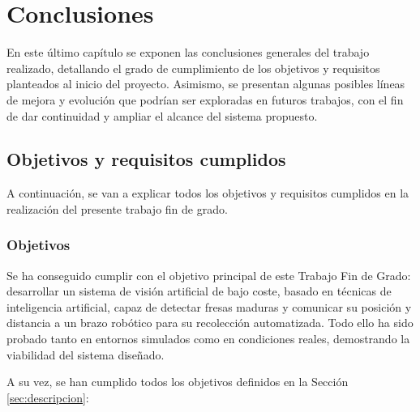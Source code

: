 \chapter{Conclusiones}
\label{cap:capitulo6}

En este último capítulo se exponen las conclusiones generales del trabajo realizado, detallando el grado de cumplimiento de los objetivos y requisitos planteados al inicio del proyecto. Asimismo, %
se presentan algunas posibles líneas de mejora y evolución que podrían ser exploradas en futuros trabajos, con el fin de dar continuidad y ampliar el alcance del sistema propuesto.

\section{Objetivos y requisitos cumplidos}
\label{sec:objetivos_y_requisitos}

A continuación, se van a explicar todos los objetivos y requisitos cumplidos en la realización del presente trabajo fin de grado.

\subsection{Objetivos}
\label{subsec:objetivos}

Se ha conseguido cumplir con el objetivo principal de este Trabajo Fin de Grado: desarrollar un sistema de visión artificial de bajo coste, basado en técnicas de inteligencia artificial, capaz de detectar fresas maduras y comunicar su posición y distancia a un brazo robótico para su recolección automatizada. Todo ello ha sido probado tanto en entornos simulados como en condiciones reales, demostrando la viabilidad del sistema diseñado.

A su vez, se han cumplido todos los objetivos definidos en la Sección \ref{sec:descripcion}:


